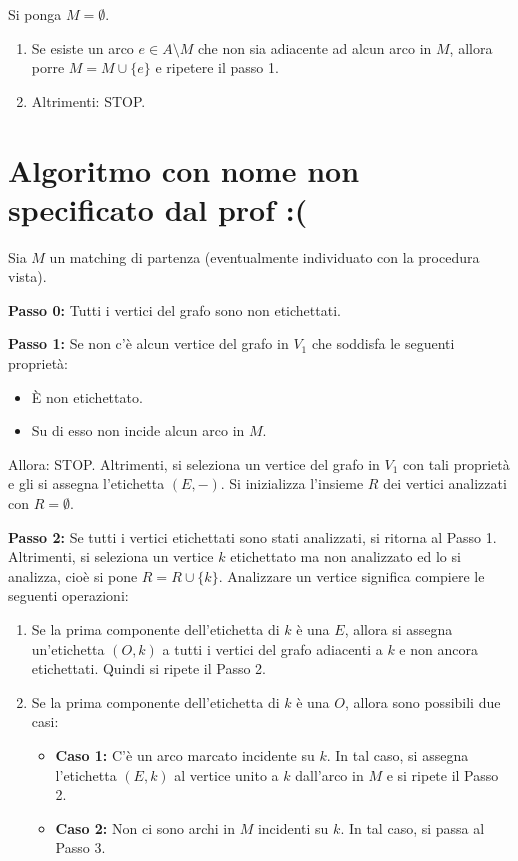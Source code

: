 Si ponga $M = \emptyset$.

\begin{enumerate}
  \item Se esiste un arco $e \in A \setminus M$ che non sia adiacente ad alcun arco in $M$, allora porre $M = M \cup \{e\}$ e ripetere il passo 1.
  \item Altrimenti: STOP.
\end{enumerate}

\section{Algoritmo con nome non specificato dal prof :(}
Sia $M$ un matching di partenza (eventualmente individuato con la procedura vista).

\textbf{Passo 0:} Tutti i vertici del grafo sono non etichettati.

\textbf{Passo 1:} Se non c'è alcun vertice del grafo in $V_1$ che soddisfa le seguenti proprietà:
\begin{itemize}
  \item È non etichettato.
  \item Su di esso non incide alcun arco in $M$.
\end{itemize}
Allora: STOP. Altrimenti, si seleziona un vertice del grafo in $V_1$ con tali proprietà e gli si assegna l'etichetta $(E, -)$. Si inizializza l'insieme $R$ dei vertici analizzati con $R = \emptyset$.

\textbf{Passo 2:} Se tutti i vertici etichettati sono stati analizzati, si ritorna al Passo 1. Altrimenti, si seleziona un vertice $k$ etichettato ma non analizzato ed lo si analizza, cioè si pone $R = R \cup \{k\}$. Analizzare un vertice significa compiere le seguenti operazioni:
\begin{enumerate}
  \item[a)] Se la prima componente dell'etichetta di $k$ è una $E$, allora si assegna un'etichetta $(O, k)$ a tutti i vertici del grafo adiacenti a $k$ e non ancora etichettati. Quindi si ripete il Passo 2.
  \item[b)] Se la prima componente dell'etichetta di $k$ è una $O$, allora sono possibili due casi:
    \begin{itemize}
      \item \textbf{Caso 1:} C'è un arco marcato incidente su $k$. In tal caso, si assegna l'etichetta $(E, k)$ al vertice unito a $k$ dall'arco in $M$ e si ripete il Passo 2.
      \item \textbf{Caso 2:} Non ci sono archi in $M$ incidenti su $k$. In tal caso, si passa al Passo 3.
    \end{itemize}
\end{enumerate}

